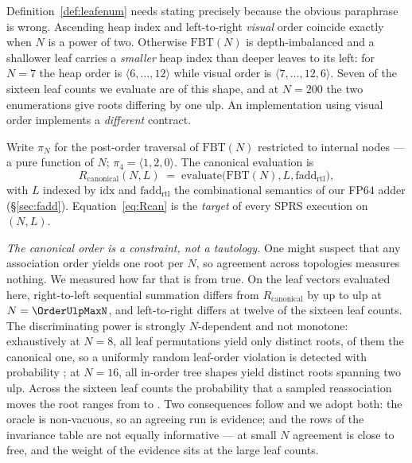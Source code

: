\documentclass[journal,10pt]{IEEEtran}
\theoremstyle{plain}
\theoremstyle{definition}
\theoremstyle{remark}
\newcommand{\FBT}{\ensuremath{\mathrm{FBT}}}
\newcommand{\fadd}{\ensuremath{\mathrm{fadd}_{\mathrm{rtl}}}}
\newcommand{\Rcan}{\ensuremath{R_{\mathrm{canonical}}}}
\newcommand{\sprs}{\textsc{SPRS}}
\renewcommand{\OrderLRDiff}{twelve}
\begin{document}
Definition~\ref{def:leafenum} needs stating precisely because the obvious
paraphrase is wrong. Ascending heap index and left-to-right \emph{visual}
order coincide exactly when $N$ is a power of two. Otherwise $\FBT(N)$ is
depth-imbalanced and a shallower leaf carries a \emph{smaller} heap index than
deeper leaves to its left: for $N=7$ the heap order is
$\langle 6,\ldots,12\rangle$ while visual order is
$\langle 7,\ldots,12,6\rangle$. Seven of the sixteen leaf counts we evaluate
are of this shape, and at $N=200$ the two enumerations give roots differing by
one ulp. An implementation using visual order implements a \emph{different}
contract.

Write $\pi_N$ for the post-order traversal of $\FBT(N)$ restricted to internal
nodes --- a pure function of $N$; $\pi_4 = \langle 1,2,0\rangle$. The
canonical evaluation is
\begin{equation}\label{eq:Rcan}
  \Rcan(N, L) \;=\; \mathrm{evaluate}\bigl(\FBT(N), L, \fadd\bigr),
\end{equation}
with $L$ indexed by $\mathrm{idx}$ and $\fadd$ the combinational semantics of
our FP64 adder (\S\ref{sec:fadd}). Equation~\eqref{eq:Rcan} is the
\emph{target} of every \sprs{} execution on $(N,L)$.

\emph{The canonical order is a constraint, not a tautology.} One might suspect
that any association order yields one root per $N$, so agreement across
topologies measures nothing. We measured how far that is from true. On the
leaf vectors evaluated here, right-to-left sequential summation differs from
$\Rcan$ by up to \OrderUlpMax{} ulp at $N = \OrderUlpMaxN$, and left-to-right
differs at \OrderLRDiff{} of the sixteen leaf counts. The discriminating power
is strongly $N$-dependent and not monotone: exhaustively at $N=8$, all
\OrderPermsEight{} leaf permutations yield only \OrderRootsEight{} distinct
roots, \OrderCanonPctEight{} of them the canonical one, so a uniformly random
leaf-order violation is detected with probability \OrderDetectEight{}; at
$N=16$, all \OrderShapesSixteen{} in-order tree shapes yield
\OrderRootsSixteen{} distinct roots spanning two ulp. Across the sixteen leaf
counts the probability that a sampled reassociation moves the root ranges from
\OrderProbMin{} to \OrderProbMax{}. Two consequences follow and we adopt both:
the oracle is non-vacuous, so an agreeing run is evidence; and the rows of the
invariance table are not equally informative --- at small $N$ agreement is
close to free, and the weight of the evidence sits at the large leaf counts.
\end{document}
